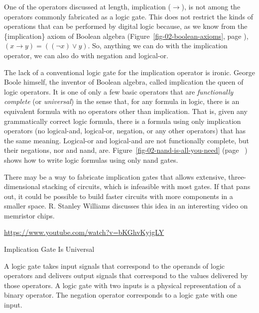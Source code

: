 \begin{aside}
One of the operators discussed at length, implication
($\rightarrow$), is not among the operators commonly fabricated
as a logic gate. This does not restrict the kinds of
operations that can be performed by digital logic because,
as we know from the \{implication\} axiom of Boolean algebra
(Figure~\ref{fig-02-boolean-axioms}, page \pageref{fig-02-boolean-axioms}),
$(x \rightarrow y) = ((\neg x) \vee y)$.
So, anything we can do with
the implication operator, we can also do with
negation and logical-or.

The lack of a conventional logic gate for the implication operator
is ironic.
George Boole himself, the inventor of Boolean algebra,
called implication the queen of logic operators.
It is one of only a few basic operators that are
\emph{functionally complete} (or \emph{universal})
in the sense that, for any formula in logic, there is an equivalent formula
with no operators other than implication.
That is, given any grammatically correct logic formula,
there is a formula using only
implication operators (no logical-and, logical-or,
negation, or any other operators)
that has the same meaning.
Logical-or and logical-and are not functionally complete,
but their negations,
nor and nand, are.
Figure~\ref{fig-02-nand-is-all-you-need} (page ~\pageref{fig-02-nand-is-all-you-need})
shows how to write logic formulas using only nand gates.

There may be a way
to fabricate implication gates that allows extensive,
three-dimensional stacking of circuits, which is infeasible with
most gates.
If that pans out, it could be possible to build
faster circuits with more components in a smaller space.
R. Stanley Williams discusses this
idea in an interesting video on memristor chips.
\begin{center}
\url{https://www.youtube.com/watch?v=bKGhvKyjgLY}
\end{center}
\caption{Implication Gate Is Universal}
\label{no-implication-gate}
\end{aside}

A logic gate takes input signals that correspond
to the operands of logic operators and delivers output signals
that correspond to the values delivered by those operators.
A logic gate with two inputs is a physical representation of
a binary operator. The negation operator corresponds to a
logic gate with one input.

